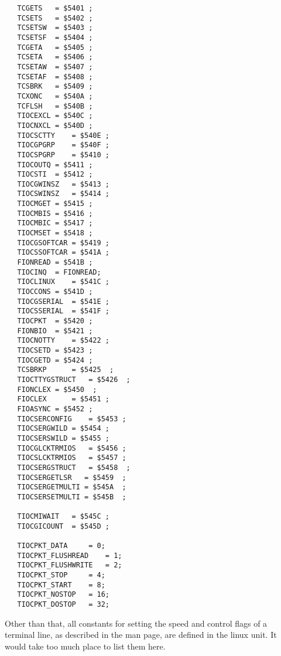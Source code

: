 \begin{verbatim}
   TCGETS	= $5401 ;
   TCSETS	= $5402 ;
   TCSETSW	= $5403 ;
   TCSETSF	= $5404 ;
   TCGETA	= $5405 ;
   TCSETA	= $5406 ;
   TCSETAW	= $5407 ;
   TCSETAF	= $5408 ;
   TCSBRK	= $5409 ;
   TCXONC	= $540A ;
   TCFLSH	= $540B ;
   TIOCEXCL	= $540C ;
   TIOCNXCL	= $540D ;
   TIOCSCTTY	= $540E ;
   TIOCGPGRP	= $540F ;
   TIOCSPGRP	= $5410 ;
   TIOCOUTQ	= $5411 ;
   TIOCSTI	= $5412 ;
   TIOCGWINSZ	= $5413 ;
   TIOCSWINSZ	= $5414 ;
   TIOCMGET	= $5415 ;
   TIOCMBIS	= $5416 ;
   TIOCMBIC	= $5417 ;
   TIOCMSET	= $5418 ;
   TIOCGSOFTCAR	= $5419 ;
   TIOCSSOFTCAR	= $541A ;
   FIONREAD	= $541B ;
   TIOCINQ	= FIONREAD;
   TIOCLINUX	= $541C ;
   TIOCCONS	= $541D ;
   TIOCGSERIAL	= $541E ;
   TIOCSSERIAL	= $541F ;
   TIOCPKT	= $5420 ;
   FIONBIO	= $5421 ;
   TIOCNOTTY	= $5422 ;
   TIOCSETD	= $5423 ;
   TIOCGETD	= $5424 ;
   TCSBRKP		= $5425	 ;
   TIOCTTYGSTRUCT	= $5426  ;
   FIONCLEX	= $5450  ;
   FIOCLEX		= $5451 ;
   FIOASYNC	= $5452 ;
   TIOCSERCONFIG	= $5453 ;
   TIOCSERGWILD	= $5454 ;
   TIOCSERSWILD	= $5455 ;
   TIOCGLCKTRMIOS	= $5456 ;
   TIOCSLCKTRMIOS	= $5457 ;
   TIOCSERGSTRUCT	= $5458  ;
   TIOCSERGETLSR   = $5459  ;
   TIOCSERGETMULTI = $545A  ;
   TIOCSERSETMULTI = $545B  ;

   TIOCMIWAIT	= $545C	;
   TIOCGICOUNT	= $545D	;

   TIOCPKT_DATA		= 0;
   TIOCPKT_FLUSHREAD	= 1;
   TIOCPKT_FLUSHWRITE	= 2;
   TIOCPKT_STOP		= 4;
   TIOCPKT_START	= 8;
   TIOCPKT_NOSTOP	= 16;
   TIOCPKT_DOSTOP	= 32;
\end{verbatim}
Other than that, all constants for setting the speed and control flags of a
terminal line, as described in the  man
page, are defined in the linux unit. It would take too much place to list
them here. 

